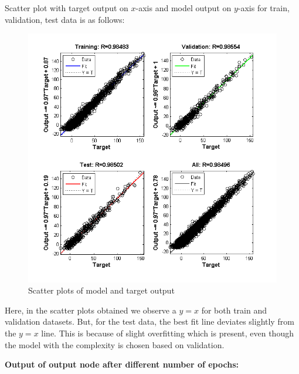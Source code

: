 \documentclass{article}
\begin{document}
Scatter plot with target output on $x$-axis and model output on $y$-axis for train, validation, test data is as follows:

\begin{figure}[H]
\centering
\includegraphics[width=\linewidth]{Regression/bivariate/scatter_1layer.png}
\caption{Scatter plots of model and target output}
\end{figure}

Here, in the scatter plots obtained we observe a $y = x$ for both train and validation datasets. But, for the test data, the best fit line deviates slightly from the $y = x$ line. This is because of slight overfitting which is present, even though the model with the complexity is chosen based on validation. 


\textbf{Output of output node after different number of epochs: } \\[10pt] 
\end{document}
